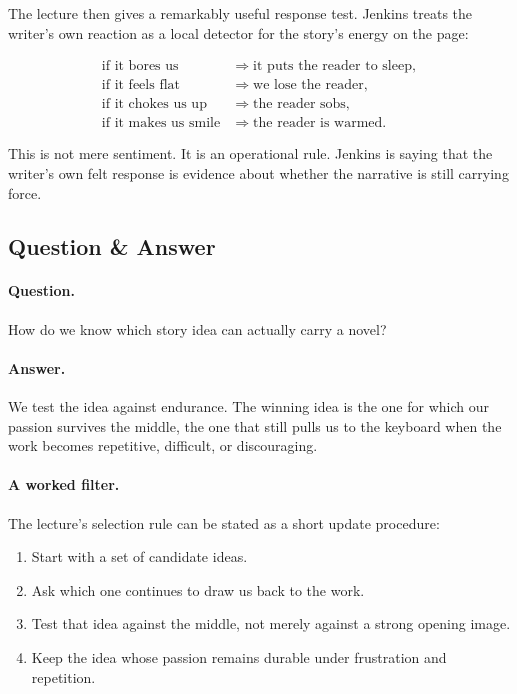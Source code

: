 The lecture then gives a remarkably useful response test. Jenkins treats the writer's own reaction as a local detector for the story's energy on the page:

\begin{align}
\text{if it bores us} &\Rightarrow \text{it puts the reader to sleep},\\
\text{if it feels flat} &\Rightarrow \text{we lose the reader},\\
\text{if it chokes us up} &\Rightarrow \text{the reader sobs},\\
\text{if it makes us smile} &\Rightarrow \text{the reader is warmed}.
\end{align}

This is not mere sentiment. It is an operational rule. Jenkins is saying that the writer's own felt response is evidence about whether the narrative is still carrying force.

\subsection{Question \& Answer}

\paragraph{Question.} How do we know which story idea can actually carry a novel?

\paragraph{Answer.} We test the idea against endurance. The winning idea is the one for which our passion survives the middle, the one that still pulls us to the keyboard when the work becomes repetitive, difficult, or discouraging.

\paragraph{A worked filter.} The lecture's selection rule can be stated as a short update procedure:

\begin{enumerate}
\item Start with a set of candidate ideas.
\item Ask which one continues to draw us back to the work.
\item Test that idea against the middle, not merely against a strong opening image.
\item Keep the idea whose passion remains durable under frustration and repetition.
\end{enumerate}

